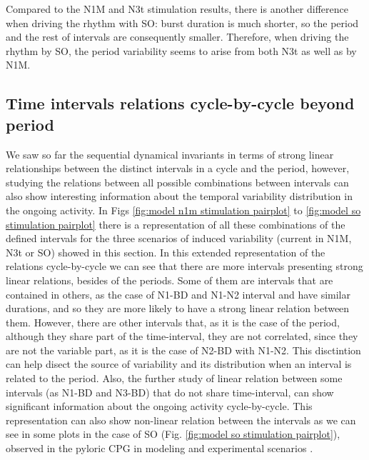 
Compared to the N1M and N3t stimulation results, there is another difference when driving the rhythm with SO: burst duration is much shorter, so the period and the rest of intervals are consequently smaller. Therefore, when driving the rhythm by SO, the period variability seems to arise from both N3t as well as by N1M. 



\subsection{Time intervals relations cycle-by-cycle beyond period}
We saw so far the sequential dynamical invariants in terms of strong linear relationships between the distinct intervals in a cycle and the period, however, studying the relations between all possible combinations between intervals can also show interesting information about the temporal variability distribution in the ongoing activity. In Figs \ref{fig:model n1m stimulation pairplot} to \ref{fig:model so stimulation pairplot} there is a representation of all these combinations of the defined intervals for the three scenarios of induced variability (current in N1M, N3t or SO) showed in this section. In this extended representation of the relations cycle-by-cycle we can see that there are more intervals presenting strong linear relations, besides of the periods. Some of them are intervals that are contained in others, as the case of N1-BD and N1-N2 interval and have similar durations, and so they are more likely to have a strong linear relation between them. However, there are other intervals that, as it is the case of the period, although they share part of the time-interval, they are not correlated, since they are not the variable part, as it is the case of N2-BD with N1-N2. This disctintion can help disect the source of variability and its distribution when an interval is related to the period. Also, the further study of linear relation between some intervals (as N1-BD and N3-BD) that do not share time-interval, can show significant information about the ongoing activity cycle-by-cycle. This representation can also show non-linear relation between the intervals as we can see in some plots in the case of SO (Fig. \ref{fig:model so stimulation pairplot}), observed in the pyloric CPG in modeling and experimental scenarios \parencite{berbel_emergence_2024}.

